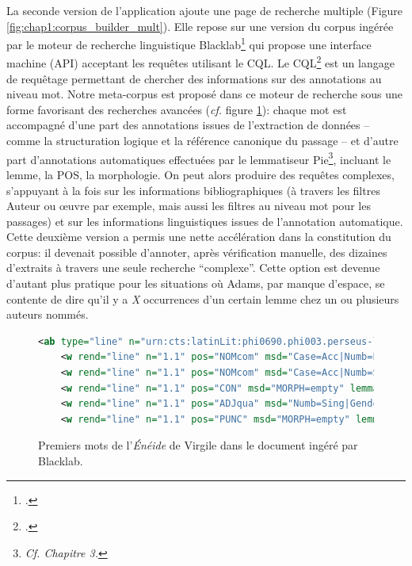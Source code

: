 La seconde version de l'application ajoute une page de recherche multiple (Figure \ref{fig:chap1:corpus_builder_mult}). Elle repose sur une version du corpus ingérée par le moteur de recherche linguistique Blacklab\footcite{de2017creating} qui propose une interface machine (API) acceptant les requêtes utilisant le \acrfull{CQL}. Le \acrshort{CQL}\footcite{christ1994modular} est un langage de requêtage permettant de chercher des informations sur des annotations au niveau mot. Notre meta-corpus est proposé dans ce moteur de recherche sous une forme favorisant des recherches avancées (\textit{cf.} figure \ref{fig:chap1:armavirumque}): chaque mot est accompagné d'une part des annotations issues de l'extraction de données -- comme la structuration logique et la référence canonique du passage -- et d'autre part d'annotations automatiques effectuées par le lemmatiseur Pie\footnote{\textit{Cf. Chapitre 3.}}, incluant le lemme, la POS, la morphologie. On peut alors produire des requêtes complexes, s'appuyant à la fois sur les informations bibliographiques (à travers les filtres Auteur ou œuvre par exemple, mais aussi les filtres au niveau mot pour les passages) et sur les informations linguistiques issues de l'annotation automatique. Cette deuxième version a permis une nette accélération dans la constitution du corpus: il devenait possible d'annoter, après vérification manuelle, des dizaines d'extraits à travers une seule recherche \enquote{complexe}. Cette option est devenue d'autant plus pratique pour les situations où Adams, par manque d'espace, se contente de dire qu'il y a \textit{X} occurrences d'un certain lemme chez un ou plusieurs auteurs nommés.

\begin{figure}
    \begin{lstlisting}[language=XML]
<ab type="line" n="urn:cts:latinLit:phi0690.phi003.perseus-lat2:1.1">
    <w rend="line" n="1.1" pos="NOMcom" msd="Case=Acc|Numb=Plur" lemma="arma">Arma</w>
    <w rend="line" n="1.1" pos="NOMcom" msd="Case=Acc|Numb=Sing" lemma="uir">virumque</w>
    <w rend="line" n="1.1" pos="CON" msd="MORPH=empty" lemma="que">{virumque}</w>
    <w rend="line" n="1.1" pos="ADJqua" msd="Numb=Sing|Gend=MascNeut|Deg=Pos|Mood=Ind|Tense=Pres|Voice=Act|Person=1" lemma="cano">cano</w>
    <w rend="line" n="1.1" pos="PUNC" msd="MORPH=empty" lemma=",">,</w>
    \end{lstlisting}
    \caption{Premiers mots de l'\textit{Énéide} de Virgile dans le document ingéré par Blacklab.}
    \label{fig:chap1:armavirumque}
\end{figure}

